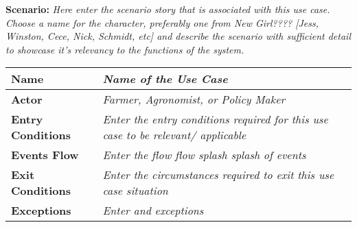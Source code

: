 \begin{flushleft}
\textbf{Scenario:} 
\textit{Here enter the scenario story that is associated with this use case. Choose a name for the character, preferably one from New Girl???? [Jess, Winston, Cece, Nick, Schmidt, etc] and describe the scenario with sufficient detail to showcase it's relevancy to the functions of the system.}
\end{flushleft}

\begin{center}
\begin{tabular}{|l|>{\raggedright\arraybackslash}m{12cm}|}

    \hline
    \textbf{Name} & \textit{Name of the Use Case}\\
    \hline
   	\textbf{Actor} & \textit{Farmer, Agronomist, or Policy Maker}\\
    \hline
    \textbf{Entry Conditions} & \textit{Enter the entry conditions required for this use case to be relevant/ applicable}\\
    \hline
    \textbf{Events Flow} & \textit{Enter the flow flow splash splash of events}\\
    \hline
    \textbf{Exit Conditions} & \textit{Enter the circumstances required to exit this use case situation}\\
    \hline
    \textbf{Exceptions} & \textit{Enter and exceptions}\\
    \hline
\end{tabular}
\end{center}
